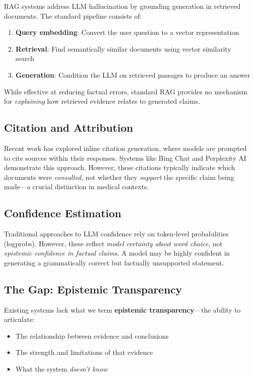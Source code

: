 \documentclass[11pt,a4paper]{article}
\begin{document}
RAG systems \cite{lewis2020retrieval} address LLM hallucination by grounding generation in retrieved documents. The standard pipeline consists of:

\begin{enumerate}
    \item \textbf{Query embedding}: Convert the user question to a vector representation
    \item \textbf{Retrieval}: Find semantically similar documents using vector similarity search
    \item \textbf{Generation}: Condition the LLM on retrieved passages to produce an answer
\end{enumerate}

While effective at reducing factual errors, standard RAG provides no mechanism for \textit{explaining} how retrieved evidence relates to generated claims.

\subsection{Citation and Attribution}

Recent work has explored inline citation generation, where models are prompted to cite sources within their responses. Systems like Bing Chat and Perplexity AI demonstrate this approach. However, these citations typically indicate which documents were \textit{consulted}, not whether they \textit{support} the specific claim being made—a crucial distinction in medical contexts.

\subsection{Confidence Estimation}

Traditional approaches to LLM confidence rely on token-level probabilities (logprobs). However, these reflect \textit{model certainty about word choice}, not \textit{epistemic confidence in factual claims}. A model may be highly confident in generating a grammatically correct but factually unsupported statement.

\subsection{The Gap: Epistemic Transparency}

Existing systems lack what we term \textbf{epistemic transparency}—the ability to articulate:
\begin{itemize}
    \item The relationship between evidence and conclusions
    \item The strength and limitations of that evidence
    \item What the system \textit{doesn't know}
\end{itemize}
\end{document}
